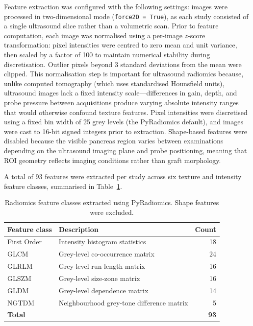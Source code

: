 Feature extraction was configured with the following settings: images were processed in two-dimensional mode (\texttt{force2D = True}), as each study consisted of a single ultrasound slice rather than a volumetric scan. Prior to feature computation, each image was normalised using a per-image $z$-score transformation: pixel intensities were centred to zero mean and unit variance, then scaled by a factor of 100 to maintain numerical stability during discretisation. Outlier pixels beyond 3 standard deviations from the mean were clipped. This normalisation step is important for ultrasound radiomics because, unlike computed tomography (which uses standardised Hounsfield units), ultrasound images lack a fixed intensity scale---differences in gain, depth, and probe pressure between acquisitions produce varying absolute intensity ranges that would otherwise confound texture features. Pixel intensities were discretised using a fixed bin width of 25 grey levels (the PyRadiomics default), and images were cast to 16-bit signed integers prior to extraction. Shape-based features were disabled because the visible pancreas region varies between examinations depending on the ultrasound imaging plane and probe positioning, meaning that ROI geometry reflects imaging conditions rather than graft morphology.

A total of 93 features were extracted per study across six texture and intensity feature classes, summarised in Table~\ref{tab:feature_classes}.

\begin{table}[ht]
\centering
\caption{Radiomics feature classes extracted using PyRadiomics. Shape features were excluded.}
\label{tab:feature_classes}
\begin{tabular}{llr}
\toprule
Feature class & Description & Count \\
\midrule
First Order & Intensity histogram statistics & 18 \\
GLCM & Grey-level co-occurrence matrix & 24 \\
GLRLM & Grey-level run-length matrix & 16 \\
GLSZM & Grey-level size-zone matrix & 16 \\
GLDM & Grey-level dependence matrix & 14 \\
NGTDM & Neighbourhood grey-tone difference matrix & 5 \\
\midrule
\textbf{Total} & & \textbf{93} \\
\bottomrule
\end{tabular}
\end{table}

